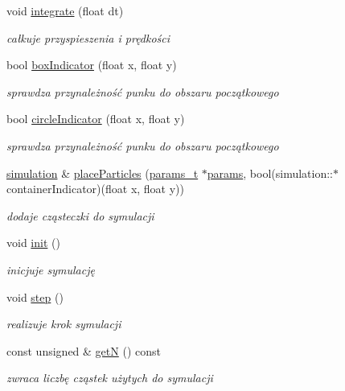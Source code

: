 \begin{DoxyCompactItemize}
void \hyperlink{classsimulation_a2b1ca39aee7b85ac2babecfd2784c459}{integrate} (float dt)
\begin{DoxyCompactList}\small\item\em całkuje przyspieszenia i prędkości \end{DoxyCompactList}\item 
bool \hyperlink{classsimulation_acd02ace3dc0db98c4c85cba7d75fa46e}{box\-Indicator} (float x, float y)
\begin{DoxyCompactList}\small\item\em sprawdza przynależność punku do obszaru początkowego \end{DoxyCompactList}\item 
bool \hyperlink{classsimulation_a3c90f4d96f7cfbafc0ef8caf4927ae2d}{circle\-Indicator} (float x, float y)
\begin{DoxyCompactList}\small\item\em sprawdza przynależność punku do obszaru początkowego \end{DoxyCompactList}\item 
\hyperlink{classsimulation}{simulation} \& \hyperlink{classsimulation_a33ce66b2291920bd1ba29889ff7c0c75}{place\-Particles} (\hyperlink{structparams__t}{params\-\_\-t} $\ast$\hyperlink{classsimulation_a861b82cc3c0e7e58abfba464a133dae3}{params}, bool(simulation\-::$\ast$container\-Indicator)(float x, float y))
\begin{DoxyCompactList}\small\item\em dodaje cząsteczki do symulacji \end{DoxyCompactList}\item 
void \hyperlink{classsimulation_a2e12616e089dd7f9742c25933bf630ef}{init} ()
\begin{DoxyCompactList}\small\item\em inicjuje symulację \end{DoxyCompactList}\item 
void \hyperlink{classsimulation_a111e26e535d53ced834dbd52948b5d69}{step} ()
\begin{DoxyCompactList}\small\item\em realizuje krok symulacji \end{DoxyCompactList}\item 
const unsigned \& \hyperlink{classsimulation_abe09252527aa58fbec8144063be3e950}{get\-N} () const 
\begin{DoxyCompactList}\small\item\em zwraca liczbę cząstek użytych do symulacji \end{DoxyCompactList}\end{DoxyCompactItemize}
